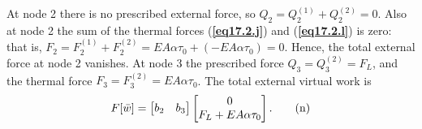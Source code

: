 \documentclass{AeroStructure-ERJohnson}
\begin{document}
\begin{example}
\begin{equation}
\end{equation}
At node 2 there is no prescribed external force, so $Q_{2}=Q_{2}^{(1)}+Q_{2}^{(2)}=0$. Also at node 2 the sum of the thermal forces (\textbf{\ref{eq17.2.j}}) and (\textbf{\ref{eq17.2.l}}) is zero: that is, $F_{2}=F_{2}^{(1)}+F_{2}^{(2)}=E A \alpha \tau_{0}+\left(-E A \alpha \tau_{0}\right)=0$. Hence, the total external force at node 2 vanishes. At node 3 the prescribed force $Q_{3}=Q_{3}^{(2)}=F_{L}$, and the thermal force $F_{3}=F_{3}^{(2)}=E A \alpha \tau_{0}$. The total external virtual work is
\begin{equation}
F[\bar{w}]=\left[\begin{array}{@{}ll@{}}b_{2} & b_{3}\end{array}\right]\left[\begin{array}{@{}c@{}}0 \\F_{L}+E A \alpha \tau_{0}\end{array}\right]. \label{eq17.2.n}\tag{n}
\end{equation}

\vspace*{-1pc}

{\def\thefigure{17.7}
}


\end{example}
\end{document}
